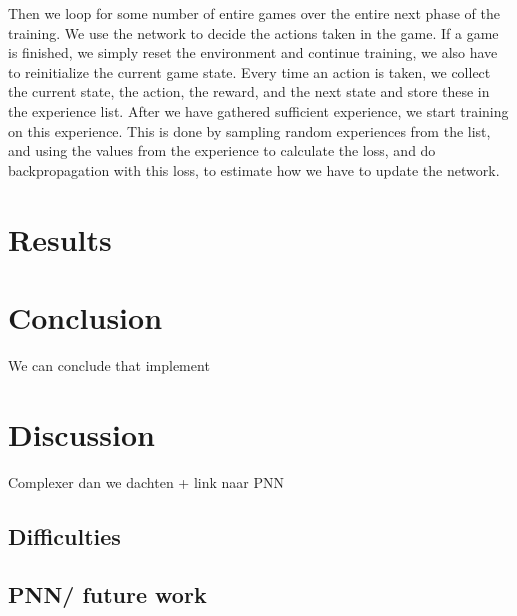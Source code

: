 \documentclass{article}
\begin{document}
Then we loop for some number of entire games over the entire next phase of the training. We use the network to decide the actions taken in the game. If a game is finished, we simply reset the environment and continue training, we also have to reinitialize the current game state. Every time an action is taken, we collect the current state, the action, the reward, and the next state and store these in the experience list. After we have gathered sufficient experience, we start training on this experience. This is done by sampling random experiences from the list, and using the values from the experience to calculate the loss, and do backpropagation with this loss, to estimate how we have to update the network. 





%




\section{Results}


\section{Conclusion}

We can conclude that implement

\section{Discussion}
Complexer dan we dachten + link naar PNN


\subsection{Difficulties}
\subsection{PNN/ future work}
\cite{*}


\end{document}
